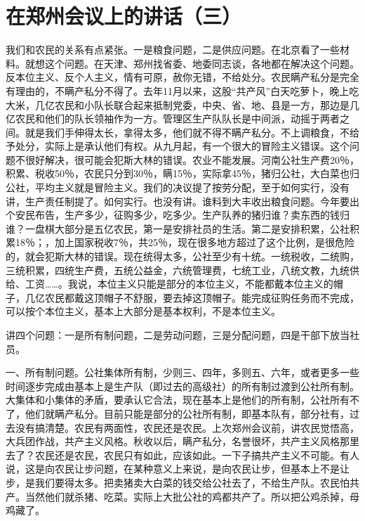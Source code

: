 \section[在郑州会议上的讲话（三）（一九五九年二月二十八日）]{在郑州会议上的讲话（三）}


我们和农民的关系有点紧张。一是粮食问题，二是供应问题。在北京看了一些材料。就想这个问题。在天津、郑州找省委、地委同志谈，各地都在解决这个问题。反本位主义、反个人主义，情有可原，赦你无错，不给处分。农民瞒产私分是完全有理由的，不瞒产私分不得了。去年11月以来，这股“共产风”白天吃萝卜，晚上吃大米，几亿农民和小队长联合起来抵制党委，中央、省、地、县是一方，那边是几亿农民和他们的队长领袖作为一方。管理区生产队队长是中间派，动摇于两者之间。就是我们手伸得太长，拿得太多，他们就不得不瞒产私分。不上调粮食，不给予处分，实际上是承认他们有权。从九月起，有一个很大的冒险主义错误。这个问题不很好解决，很可能会犯斯大林的错误。农业不能发展。河南公社生产费20％，积累、税收50％，农民只分到30％，瞒15％，实际拿45％，猪归公社，大白菜也归公社，平均主义就是冒险主义。我们的决议提了按劳分配，至于如何实行，没有讲，生产责任制提了。如何实行。也没有讲。谁料到大丰收出粮食问题。今年要出个安民布告，生产多少，征购多少，吃多少。生产队养的猪归谁？卖东西的钱归谁？一盘棋大部分是五亿农民，第一是安排社员的生活。第二是安排积累，公社积累18％；，加上国家税收7％，共25％，现在很多地方超过了这个比例，是很危险的，就会犯斯大林的错误。现在统得太多，公社至少有十统。一统税收，二统购，三统积累，四统生产费，五统公益金，六统管理费，七统工业，八统文教，九统供给、工资……。我说，本位主义只能是部分的本位主义，不能都戴本位主义的帽子，几亿农民都戴这顶帽子不舒服，要去掉这顶帽子。能完成征购任务而不完成，可以按个本位主义，基本上大部分是基本权利，不是本位主义。

讲四个问题：一是所有制问题，二是劳动问题，三是分配问题，四是干部下放当社员。

一、所有制问题。公社集体所有制，少则三、四年，多则五、六年，或者更多一些时间逐步完成由基本上是生产队（即过去的高级社）的所有制过渡到公社所有制。大集体和小集体的矛盾，要承认它合法，现在基本上是他们的所有制，公社所有不了，他们就瞒产私分。目前只能是部分的公社所有制，即基本队有，部分社有，过去没有搞清楚。农民有两面性，农民还是农民。上次郑州会议前，讲农民觉悟高，大兵团作战，共产主义风格。秋收以后，瞒产私分，名誉很坏，共产主义风格那里去了？农民还是农民，农民只有如此，应该如此。一下子搞共产主义不可能。有人说，这是向农民让步问题，在某种意义上来说，是向农民让步，但基本上不是让步，是我们要得太多。把卖猪卖大白菜的钱交给公社去了，不给生产队。农民怕共产。当然他们就杀猪、吃菜。实际上大批公社的鸡都共产了。所以把公鸡杀掉，母鸡藏了。

